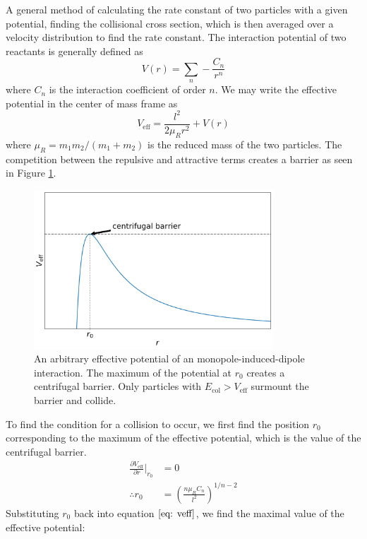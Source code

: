 A general method of calculating the rate constant of two particles with a given potential, finding the collisional cross section, which is then averaged over a velocity distribution to find the rate constant.\cite{Zhang2017,Brouard2012} The interaction potential of two reactants is generally defined as
\begin{equation}
    V(r) = \sum_n - \frac{C_n}{r^n}
\end{equation}
where $C_n$ is the interaction coefficient of order $n$. We may write the effective potential in the center of mass frame as
\begin{equation}
    V_{\mathrm{eff}} = \frac{l^2}{2 \mu_R r^2} + V(r)\label{eq: veff}
\end{equation}
where $\mu_R=m_1 m_2/(m_1 + m_2)$ is the reduced mass of the two particles. The competition between the repulsive and attractive terms creates a barrier as seen in Figure \ref{fig: veff}.
\begin{figure}[H]
	\centering
	\includegraphics[width=0.8\textwidth]{images/v_eff.png}
	\caption{An arbitrary effective potential of an monopole-induced-dipole interaction. The maximum of the potential at $r_0$ creates a centrifugal barrier. Only particles with $E_{\mathrm{col}} > V_{\mathrm{eff}}$ surmount the barrier and collide.}
	\label{fig: veff}
\end{figure}
To find the condition for a collision to occur, we first find the position $r_0$ corresponding to the maximum of the effective potential, which is the value of the centrifugal barrier.
\begin{align*}
    \frac{\partial V_{\mathrm{eff}}}{\partial r}\bigg|_{r_0} & = 0 \\
    \therefore r_0 & = \left(\frac{n \mu_R C_n}{l^2}\right)^{1/n-2}
\end{align*}
Substituting $r_0$ back into equation $\ref{eq: veff}$, we find the maximal value of the effective potential:
